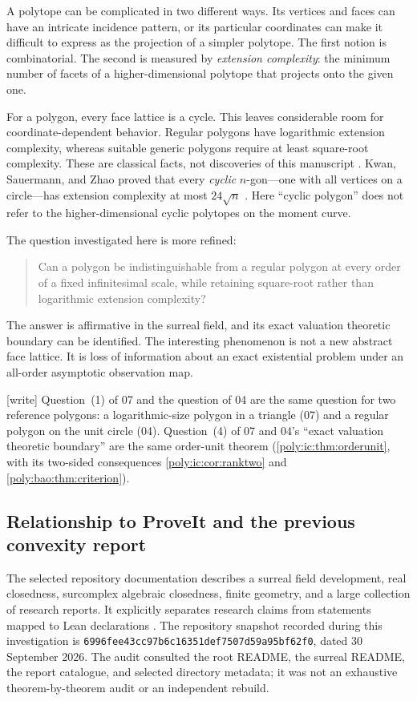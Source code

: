 \documentclass[11pt,a4paper]{article}
\numberwithin{equation}{section}
\theoremstyle{plain}
\newcommand{\wtag}{\textup{[write]}}%
\begin{document}
A polytope can be complicated in two different ways. Its vertices and faces
can have an intricate incidence pattern, or its particular coordinates can
make it difficult to express as the projection of a simpler polytope. The
first notion is combinatorial. The second is measured by
\emph{extension complexity}: the minimum number of facets of a
higher-dimensional polytope that projects onto the given one.

For a polygon, every face lattice is a cycle. This leaves considerable room
for coordinate-dependent behavior. Regular polygons have logarithmic
extension complexity, whereas suitable generic polygons require at least
square-root complexity. These are classical facts, not discoveries of this
manuscript \cite{ic:frt,ic:kp}. Kwan, Sauermann, and Zhao proved that every
\emph{cyclic} $n$-gon---one with all vertices on a circle---has extension
complexity at most $24\sqrt n$ \cite{bao:KSZ}. Here ``cyclic polygon'' does not
refer to the higher-dimensional cyclic polytopes on the moment curve.

The question investigated here is more refined:
\begin{quote}
Can a polygon be indistinguishable from a regular polygon at every order
of a fixed infinitesimal scale, while retaining square-root rather than
logarithmic extension complexity?
\end{quote}
The answer is affirmative in the surreal field, and its exact valuation
theoretic boundary can be identified. The interesting phenomenon is not a
new abstract face lattice. It is loss of information about an exact
existential problem under an all-order asymptotic observation map.

\wtag{} Question~(1) of 07 and the question of 04 are the same question for
two reference polygons: a logarithmic-size polygon in a triangle (07) and a
regular polygon on the unit circle (04). Question~(4) of 07 and 04's
``exact valuation theoretic boundary'' are the same order-unit theorem
(\cref{poly:ic:thm:orderunit}, with its two-sided consequences
\cref{poly:ic:cor:ranktwo} and \cref{poly:bao:thm:criterion}).

\subsection{Relationship to ProveIt and the previous convexity report}
The selected repository documentation describes a surreal field development,
real closedness, surcomplex algebraic closedness, finite geometry, and a
large collection of research reports. It explicitly separates research
claims from statements mapped to Lean declarations \cite{ic:repo,ic:surrealrepo}.
The repository snapshot recorded during this investigation is
\texttt{6996fee43cc97b6c16351def7507d59a95bf62f0}, dated 30 September 2026.
The audit consulted the root README, the surreal README, the report catalogue,
and selected directory metadata; it was not an exhaustive theorem-by-theorem
audit or an independent rebuild.
\end{document}
